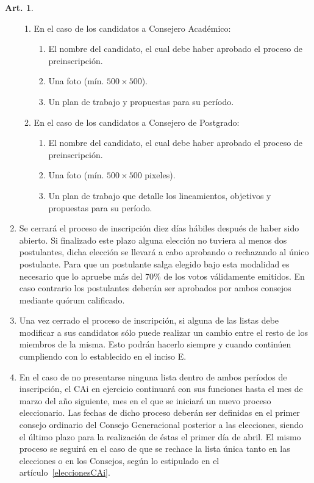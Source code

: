 \documentclass[letterpaper,11pt]{article}
\theoremstyle{definition}%
\newtheorem{art}{Art.} %
\begin{document}
\begin{art}
\begin{enumerate}
\begin{enumerate}
			      \item En el caso de los candidatos a Consejero Académico:
			            \begin{enumerate}
				            \item El nombre del candidato, el cual debe haber aprobado el proceso de preinscripción.
				            \item Una foto (mín. $500 \times 500$).
				            \item Un plan de trabajo y propuestas para su período.
			            \end{enumerate}

			      \item En el caso de los candidatos a Consejero de Postgrado:
			            \begin{enumerate}
				            \item El nombre del candidato, el cual debe haber aprobado el proceso de preinscripción.
				            \item Una foto (mín. $500 \times 500$ pixeles).
				            \item Un plan de trabajo que detalle los lineamientos, objetivos y propuestas para su período.
			            \end{enumerate}
		      \end{enumerate}

		\item\label{cierre}Se cerrará el proceso de inscripción diez días hábiles después de haber sido abierto. Si finalizado este plazo alguna elección no tuviera al menos dos postulantes, dicha elección se llevará a cabo aprobando o rechazando al único postulante. Para que un postulante salga elegido bajo esta modalidad es necesario que lo apruebe más del 70\% de los votos válidamente emitidos. En caso contrario los postulantes deberán ser aprobados por ambos consejos mediante quórum calificado.

		\item Una vez cerrado el proceso de inscripción, si alguna de las listas debe modificar a sus candidatos sólo puede realizar un cambio entre el resto de los miembros de la misma. Esto podrán hacerlo siempre y cuando continúen cumpliendo con lo establecido en el inciso E.

		\item En el caso de no presentarse ninguna lista dentro de ambos períodos de inscripción, el CAi en ejercicio continuará con sus funciones hasta el mes de marzo del año siguiente, mes en el que se iniciará un nuevo proceso eleccionario. Las fechas de dicho proceso deberán ser definidas en  el primer consejo ordinario del Consejo Generacional posterior a las elecciones, siendo el último plazo para la realización de éstas el primer día de abril. El mismo proceso se seguirá en el caso de que se rechace la lista única tanto en las elecciones o en los Consejos, según lo estipulado en el artículo~\ref{eleccionesCAi}.


\end{enumerate}
\end{art}
\end{document}
